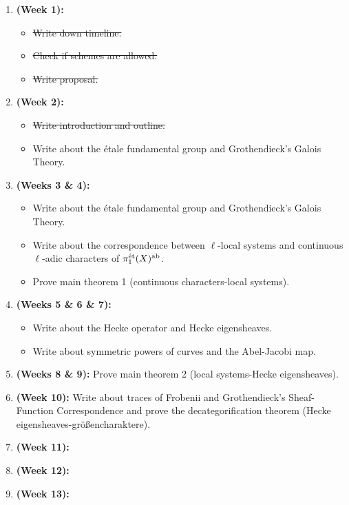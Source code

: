 	\begin{enumerate}
	    \item \textbf{(Week 1):} 
	        \begin{itemize}
	            \item \st{Write down timeline.}
	            \item \st{Check if schemes are allowed.}
	            \item \st{Write proposal.}
	        \end{itemize}
	    \item \textbf{(Week 2):} 
	        \begin{itemize}
	            \item \st{Write introduction and outline.}
	            \item Write about the \'etale fundamental group and Grothendieck's Galois Theory.
	        \end{itemize}
	    \item \textbf{(Weeks 3 \& 4):} 
	        \begin{itemize}
	            \item Write about the \'etale fundamental group and Grothendieck's Galois Theory.
	            \item Write about the correspondence between $\ell$-local systems and continuous $\ell$-adic characters of $\pi_1^{\mathrm{\acute{e}t}}(X)^{\mathrm{ab}}$. 
	            \item Prove main theorem 1 (continuous characters-local systems).
	        \end{itemize}
	    \item \textbf{(Weeks 5 \& 6 \& 7):}
	        \begin{itemize}
	            \item Write about the Hecke operator and Hecke eigensheaves.
	            \item Write about symmetric powers of curves and the Abel-Jacobi map.
	        \end{itemize}
	    \item \textbf{(Weeks 8 \& 9):} Prove main theorem 2 (local systems-Hecke eigensheaves).
	    \item \textbf{(Week 10):} Write about traces of Frobenii and Grothendieck's Sheaf-Function Correspondence and prove the decategorification theorem (Hecke eigensheaves-gr\"o{\ss}encharaktere).
	    \item \textbf{(Week 11):}
	    \item \textbf{(Week 12):}
	    \item \textbf{(Week 13):}
	\end{enumerate}
	

